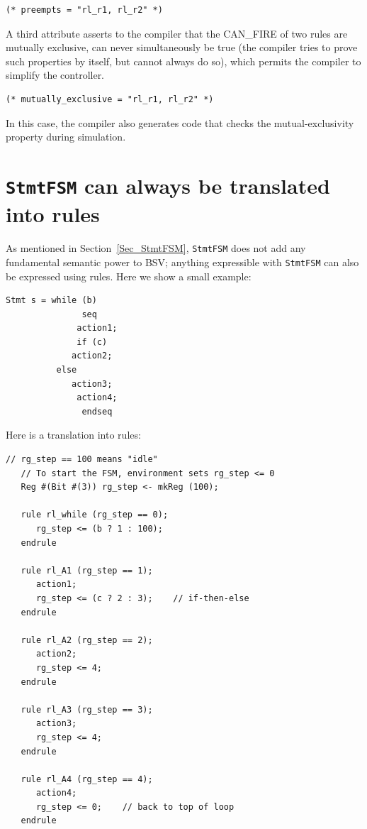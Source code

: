 {\small
\begin{Verbatim}[frame=single,label=BSV]
(* preempts = "rl_r1, rl_r2" *)
\end{Verbatim}
}

A third attribute asserts to the compiler that the CAN\_FIRE of two
rules are mutually exclusive, {\ie} can never simultaneously be true
(the compiler tries to prove such properties by itself, but cannot
always do so), which permits the compiler to simplify the controller.

{\small
\begin{Verbatim}[frame=single,label=BSV]
(* mutually_exclusive = "rl_r1, rl_r2" *)
\end{Verbatim}
}

In this case, the compiler also generates code that checks the
mutual-exclusivity property during simulation.


\section{{\tt StmtFSM} can always be translated into rules}

\label{Sec_StmtFSM_translation_into_rules}


As mentioned in Section~\ref{Sec_StmtFSM}, \verb|StmtFSM| does not add
any fundamental semantic power to BSV; anything expressible with
\verb|StmtFSM| can also be expressed using rules.  
Here we show a small example:

{\small
\begin{Verbatim}[frame=single,label=BSV]
   Stmt s = while (b)
               seq
	          action1;
	          if (c)
		     action2;
		  else
		     action3;
	          action4;
               endseq
\end{Verbatim}
}

Here is a translation into rules:

{\small
\begin{Verbatim}[frame=single,label=BSV]
   // rg_step == 100 means "idle"
   // To start the FSM, environment sets rg_step <= 0
   Reg #(Bit #(3)) rg_step <- mkReg (100);

   rule rl_while (rg_step == 0);
      rg_step <= (b ? 1 : 100);
   endrule

   rule rl_A1 (rg_step == 1);
      action1;
      rg_step <= (c ? 2 : 3);    // if-then-else
   endrule

   rule rl_A2 (rg_step == 2);
      action2;
      rg_step <= 4;
   endrule

   rule rl_A3 (rg_step == 3);
      action3;
      rg_step <= 4;
   endrule

   rule rl_A4 (rg_step == 4);
      action4;
      rg_step <= 0;    // back to top of loop
   endrule
\end{Verbatim}
}

